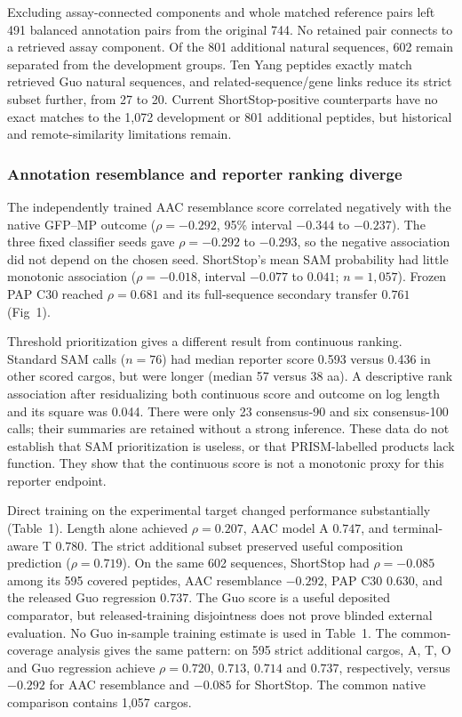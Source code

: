\documentclass[11pt,a4paper]{article}
\begin{document}
Excluding assay-connected components and whole matched reference pairs left
491 balanced annotation pairs from the original 744. No retained pair connects
to a retrieved assay component. Of the 801 additional natural sequences, 602
remain separated from the development groups. Ten Yang peptides exactly match
retrieved Guo natural sequences, and related-sequence/gene links reduce its
strict subset further, from 27 to 20. Current ShortStop-positive counterparts
have no exact matches to the 1,072 development or 801 additional peptides, but
historical and remote-similarity limitations remain.

\subsubsection{Annotation resemblance and reporter ranking diverge}
The independently trained AAC resemblance score correlated negatively with
the native GFP--MP outcome ($\rho=-0.292$, 95\% interval $-0.344$ to $-0.237$).
The three fixed classifier seeds gave $\rho=-0.292$ to $-0.293$, so the negative association did not depend on the chosen seed. ShortStop's mean SAM probability had little monotonic
association ($\rho=-0.018$, interval $-0.077$ to $0.041$; $n=1,057$).
Frozen PAP C30 reached $\rho=0.681$ and its full-sequence secondary transfer
$0.761$ (Fig~1).




Threshold prioritization gives a different result from continuous ranking.
Standard SAM calls ($n=76$) had median reporter score 0.593 versus 0.436 in
other scored cargos, but were longer (median 57 versus 38 aa). A descriptive
rank association after residualizing both continuous score and outcome on
log length and its square was 0.044. There were only 23 consensus-90 and six
consensus-100 calls; their summaries are retained without a strong inference.
These data do not establish that SAM prioritization is useless, or that
PRISM-labelled products lack function. They show that the continuous score
is not a monotonic proxy for this reporter endpoint.

Direct training on the experimental target changed performance substantially
(Table~1). Length alone achieved $\rho=0.207$, AAC model A
$0.747$, and terminal-aware T $0.780$. The strict additional subset preserved
useful composition prediction ($\rho=0.719$). On the same 602 sequences,
ShortStop had $\rho=-0.085$ among its 595 covered peptides, AAC resemblance
$-0.292$, PAP C30 $0.630$, and the released Guo regression $0.737$. The Guo
score is a useful deposited comparator, but released-training disjointness
does not prove blinded external evaluation. No Guo in-sample training estimate
is used in Table~1.
The common-coverage analysis gives the same pattern: on 595 strict additional
cargos, A, T, O and Guo regression achieve $\rho=0.720$, $0.713$, $0.714$
and $0.737$, respectively, versus $-0.292$ for AAC resemblance and $-0.085$
for ShortStop. The common native comparison contains 1,057 cargos.
\end{document}
